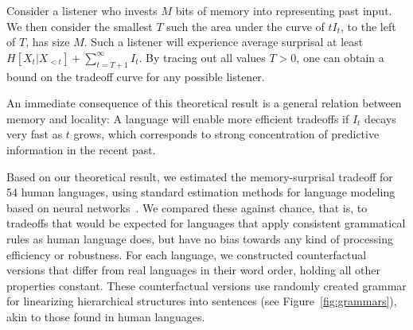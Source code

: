 \documentclass[11pt,letterpaper]{article}
\newcounter{theorem}
\begin{document}
Consider a listener who invests $M$ bits of memory into representing past input.
We then consider the smallest $T$ such the area under the curve of $t I_t$, to the left of $T$, has size $M$.
Such a listener will experience average surprisal at least $H[X_t| X_{<t}] + \sum_{t=T+1}^\infty I_t$.
By tracing out all values $T >0$, one can obtain a bound on the tradeoff curve for any possible listener.


An immediate consequence of this theoretical result is a general relation between memory and locality:
A language will enable more efficient tradeoffs if $I_t$ decays very fast as $t$ grows, which corresponds to strong concentration of predictive information in the recent past.








%
%




Based on our theoretical result, we estimated the memory-surprisal tradeoff for 54 human languages, using standard estimation methods for language modeling based on neural networks~\citep{hochreiter-long-1997}.
We compared these against chance, that is, to tradeoffs that would be expected for languages that apply consistent grammatical rules as human language does, but have no bias towards any kind of processing efficiency or robustness.
For each language, we constructed counterfactual versions that differ from real languages in their word order, holding all other properties constant.
These counterfactual versions use randomly created grammar for linearizing hierarchical structures into sentences (see Figure~\ref{fig:grammars}), akin to those found in human languages.
\end{document}
